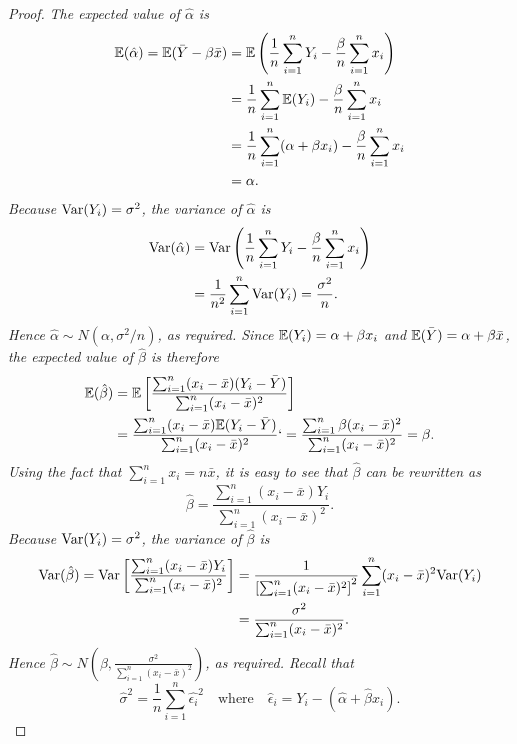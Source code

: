\begin{proof}
\ben
\it %
The expected value of $\hat{\alpha}$ is 
\begin{align*}
\mathbb{E}(\hat{\alpha})
	= \mathbb{E}(\bar{Y}-\beta\bar{x})
	& = \mathbb{E}\left(\frac{1}{n}\sum_{i=1}^n Y_i - \frac{\beta}{n}\sum_{i=1}^n x_i\right) \\
	& = \frac{1}{n}\sum_{i=1}^n \mathbb{E}(Y_i) - \frac{\beta}{n}\sum_{i=1}^n x_i \\
	& = \frac{1}{n}\sum_{i=1}^n (\alpha+\beta x_i) - \frac{\beta}{n}\sum_{i=1}^n x_i \\
	& = \alpha.
\end{align*}
Because $\text{Var}(Y_i)=\sigma^2$, the variance of $\hat{\alpha}$ is 
\begin{align*}
\text{Var}(\hat{\alpha})
	& = \text{Var}\left(\frac{1}{n}\sum_{i=1}^n Y_i - \frac{\beta}{n}\sum_{i=1}^n x_i\right) \\
	& = \frac{1}{n^2}\sum_{i=1}^n \text{Var}(Y_i)
	= \frac{\sigma^2}{n}.
\end{align*}
Hence $\hat{\alpha} \sim N(\alpha,\sigma^2/n)$, as required.
\it %
Since $\mathbb{E}(Y_i) = \alpha + \beta x_i$ and $\mathbb{E}(\bar{Y}) = \alpha + \beta\bar{x}$, the expected value of $\hat{\beta}$ is therefore
\begin{align*}
\mathbb{E}(\hat{\beta})
	& = \mathbb{E}\left[\frac{\sum_{i=1}^n (x_i-\bar{x})(Y_i-\bar{Y})}{\sum_{i=1}^n (x_i-\bar{x})^2}\right] \\
	& = \frac{\sum_{i=1}^n (x_i-\bar{x})\mathbb{E}(Y_i-\bar{Y})}{\sum_{i=1}^n (x_i-\bar{x})^2} 
`	= \frac{\sum_{i=1}^n \beta(x_i-\bar{x})^2}{\sum_{i=1}^n (x_i-\bar{x})^2} = \beta.
\end{align*}
Using the fact that $\sum_{i=1}^n x_i = n\bar{x}$, it is easy to see that $\hat{\beta}$ can be rewritten as
\[
\hat{\beta} = \frac{\sum_{i=1}^n (x_i-\bar{x})Y_i}{\sum_{i=1}^n (x_i-\bar{x})^2}.
\]
Because $\text{Var}(Y_i)=\sigma^2$, the variance of $\hat{\beta}$ is
\begin{align*}
\text{Var}(\hat{\beta})
	= \text{Var}\left[\frac{\sum_{i=1}^n (x_i-\bar{x})Y_i}{\sum_{i=1}^n (x_i-\bar{x})^2}\right]
	& = \frac{1}{\left[\sum_{i=1}^n(x_i-\bar{x})^2\right]^2}\sum_{i=1}^n(x_i-\bar{x})^2\text{Var}(Y_i) \\
	& = \frac{\sigma^2}{\sum_{i=1}^n(x_i-\bar{x})^2}.
\end{align*}
Hence $\hat{\beta}\sim N\left(\beta,\frac{\sigma^2}{\sum_{i=1}^n(x_i-\bar{x})^2}\right)$, as required.
\it %
Recall that
\[
\hat{\sigma}^2 = \frac{1}{n}\sum_{i=1}^n \hat{\epsilon_i}^2
\quad\text{where}\quad
\hat{\epsilon}_i = Y_i-(\hat{\alpha}+\hat{\beta} x_i).
\]
\end{proof}
